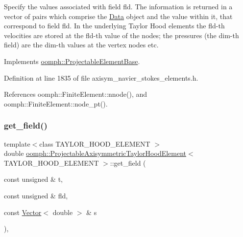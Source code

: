 Specify the values associated with field fld. The information is returned in a vector of pairs which comprise the \hyperlink{classoomph_1_1Data}{Data} object and the value within it, that correspond to field fld. In the underlying Taylor Hood elements the fld-\/th velocities are stored at the fld-\/th value of the nodes; the pressures (the dim-\/th field) are the dim-\/th values at the vertex nodes etc. 



Implements \hyperlink{classoomph_1_1ProjectableElementBase_a644306ebdf16f334344c2d27d72f18b7}{oomph\+::\+Projectable\+Element\+Base}.



Definition at line 1835 of file axisym\+\_\+navier\+\_\+stokes\+\_\+elements.\+h.



References oomph\+::\+Finite\+Element\+::nnode(), and oomph\+::\+Finite\+Element\+::node\+\_\+pt().

\mbox{\label{classoomph_1_1ProjectableAxisymmetricTaylorHoodElement_a81c20f0a3190e00053f095ccc5f70691}} 
\subsubsection{\texorpdfstring{get\+\_\+field()}{get\_field()}}
{\footnotesize\ttfamily template$<$class T\+A\+Y\+L\+O\+R\+\_\+\+H\+O\+O\+D\+\_\+\+E\+L\+E\+M\+E\+NT $>$ \\
double \hyperlink{classoomph_1_1ProjectableAxisymmetricTaylorHoodElement}{oomph\+::\+Projectable\+Axisymmetric\+Taylor\+Hood\+Element}$<$ T\+A\+Y\+L\+O\+R\+\_\+\+H\+O\+O\+D\+\_\+\+E\+L\+E\+M\+E\+NT $>$\+::get\+\_\+field (\begin{DoxyParamCaption}\item[{const unsigned \&}]{t,  }\item[{const unsigned \&}]{fld,  }\item[{const \hyperlink{classoomph_1_1Vector}{Vector}$<$ double $>$ \&}]{s }\end{DoxyParamCaption})\hspace{0.3cm}{\ttfamily [inline]}, {\ttfamily [virtual]}}



